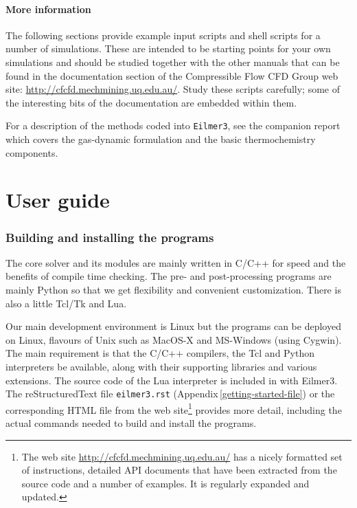 \documentclass[12pt,a4paper,twoside]{article}
\begin{document}
\subsection{More information}
% 
The following sections provide example input scripts and shell scripts for a number of simulations.
These are intended to be starting points for your own simulations and should be studied together with 
the other manuals that can be found in the documentation section of the 
Compressible Flow CFD Group web site:  
\url{http://cfcfd.mechmining.uq.edu.au/}.
Study these scripts carefully; some of the interesting bits of the documentation are
embedded within them.

\medskip
For a description of the methods coded into \texttt{Eilmer3}, see the companion report \cite{jacobs_etal_2010b}
which covers the gas-dynamic formulation and the basic thermochemistry components.

\clearpage

\part{User guide}

\section{Building and installing the programs}
%
The core solver and its modules are mainly written in C/C++ for speed and the benefits of compile time checking. 
The pre- and post-processing programs are mainly Python so that we get flexibility and convenient customization.
There is also a little Tcl/Tk and Lua.

\medskip
Our main development environment is Linux but the programs can be deployed on
Linux, flavours of Unix such as MacOS-X and MS-Windows (using Cygwin).
The main requirement is that the C/C++ compilers, the Tcl and Python
interpreters be available, along with their supporting libraries and 
various extensions. 
The source code of the Lua interpreter is included in with Eilmer3.
The reStructuredText file \texttt{eilmer3.rst} (Appendix\,\ref{getting-started-file}) 
or the corresponding HTML file from the web site\footnote{The web site 
\url{http://cfcfd.mechmining.uq.edu.au/} has a nicely formatted set of instructions,
detailed API documents that have been extracted from the source code and 
a number of examples.  It is regularly expanded and updated.}
provides more detail, including the actual commands needed to build and install the programs.
\end{document}
